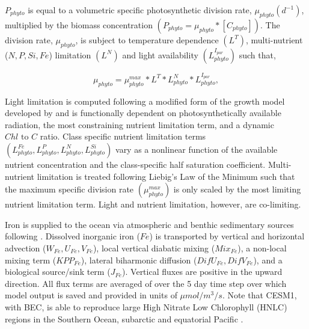 \documentclass{article}
\begin{document}
$P_{phyto}$ is equal to a volumetric specific photosynthetic division rate, $\mu_{phyto} (d^{-1})$, multiplied by the biomass concentration $(P_{phyto}=\mu_{phyto}*[C_{phyto}])$. The division rate, $\mu_{phyto}$, is subject to temperature dependence $(L^T)$, multi-nutrient ($N, P, Si, Fe$) limitation $(L^N)$ and light availability $(L^{I_{par}}_{phyto})$ such that,

\begin{equation}
    \mu_{phyto} = \mu^{max}_{phyto}*L^T*L^N_{phyto}*L^{I_{par}}_{phyto},
\end{equation}


Light limitation is computed following a modified form of the growth model developed by \textcite{Geiderdynamicregulatorymodel1998} and is functionally dependent on photosynthetically available radiation, the most constraining nutrient limitation term, and a dynamic $Chl \textrm{ to } C$ ratio. Class specific nutrient limitation terms $(L^{Fe}_{phyto}, L^{P}_{phyto}, L^{N}_{phyto}, L^{Si}_{phyto})$ vary as a nonlinear function of the available nutrient concentration and the class-specific half saturation coefficient. Multi-nutrient limitation is treated following Liebig’s Law of the Minimum \parencite{vanderPloegOriginTheoryMineral1999} such that the maximum specific division rate $(\mu^{max}_{phyto})$ is only scaled by the most limiting nutrient limitation term. Light and nutrient limitation, however, are co-limiting.

Iron is supplied to the ocean via atmospheric and benthic sedimentary sources following \textcite{MooreSedimentarymineraldust2008}. Dissolved inorganic iron ($Fe$) is transported by vertical and horizontal advection ($W_{Fe}, U_{Fe}, V_{Fe}$), local vertical diabatic mixing ($Mix_{Fe}$), a non-local mixing term ($KPP_{Fe}$), lateral biharmonic diffusion ($DifU_{Fe}, DifV_{Fe}$), and a biological source/sink term ($J_{Fe}$). Vertical fluxes are positive in the upward direction. All flux terms are averaged of over the 5 day time step over which model output is saved and provided in units of $\mu mol/m^3/s$. Note that CESM1, with BEC, is able to reproduce large High Nitrate Low Chlorophyll (HNLC) regions in the Southern Ocean, subarctic and equatorial Pacific \parencite{MooreUpperoceanecosystem2004,MooreSedimentarymineraldust2008, HarrisonMesoscaleEffectsCarbon2018}. 
\end{document}
